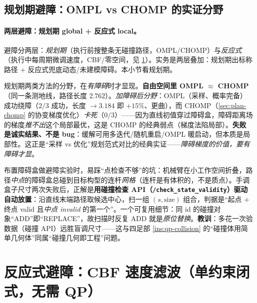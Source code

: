 \subsection{规划期避障：OMPL vs CHOMP 的实证分野}
\label{sec:ap-planavoid}

\paragraph{两层避障：规划期 global + 反应式 local。}
避障分两层：\emph{规划期}（执行前搜整条无碰撞路径，OMPL/CHOMP）与\emph{反应式}（执行中每周期微调速度，CBF/零空间，见 \cref{sec:ap-cbf}）。实务是两层叠加：规划期出标称路径 + 反应式兜底动态/未建模障碍。本小节看规划期。

\begin{insight}\label{ins:ap-ompl-chomp}
规划期两类方法的分野，在\emph{有障碍}时才显现。\textbf{自由空间里 OMPL $\approx$ CHOMP}（同一条测地线，路径长度 $2.762$）。\emph{加障碍后分野}：OMPL（采样、概率完备）成功绕障（$2/3$ 成功，长度 $\to 3.184$ 即 $+15\%$、更曲），而 CHOMP（\cref{sec:plan-chomp} 的协变梯度优化）\emph{卡死}（$0/3$）——因为直线初值穿过障碍盒，障碍距离场的梯度\emph{推不出}这个局部最优，这是 CHOMP 的经典弱点（梯度法陷局部）。\textbf{失败是诚实结果、不是 bug}：缓解可用多迭代/随机重启/OMPL 暖启动，但本质是局部性。这正是“采样 vs 优化”规划范式对比的经典实证——\emph{障碍梯度的价值，要有障碍才显}。
\end{insight}

\begin{pitfall}\label{pit:ap-collision-volume}
布置障碍盒做避障实验时，易踩“点检查不够”的坑：机械臂在小工作空间折叠，路径\emph{中点}的障碍盒总碰到目标构型的连杆\emph{网格}（连杆是有体积的，不是质点）。手调盒子尺寸两次失败后，正解是\textbf{用碰撞检查 API（\texttt{/check\_state\_validity}）驱动自动放置}：沿直线末端路径取候选中心，扫一组 $(s,\text{size})$ 组合，判据是“起点 $+$ 终点 valid 且\emph{中点 invalid} 的第一个”。一个可复用细节：同 id 的碰撞对象“ADD”即“REPLACE”，故扫描时反复 ADD 就是\emph{原位替换}。\textbf{教训}：多花一次验数据（碰撞 API）远胜盲调尺寸——这与四足部 \cref{ins:qp-collision} 的“碰撞体用简单几何体”同属“碰撞几何即工程”问题。
\end{pitfall}

\section{反应式避障：CBF 速度滤波（单约束闭式，无需 QP）}
\label{sec:ap-cbf}

